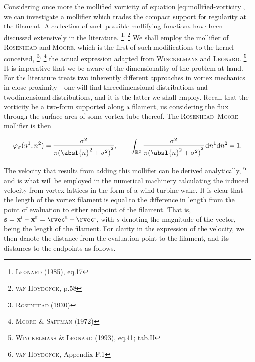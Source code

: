 Considering once more the mollified vorticity of equation \eqref{eq:mollified-vorticity}, we can investigate a mollifier which trades the compact support for regularity at the filament.
A collection of such possible mollifying functions have been discussed extensively in the literature.%
\footnote{%
  \cite{leonard1985computing} \textsc{Leonard} (1985), eq.17
}\textsuperscript{,}%
\footnote{%
  \cite{hoydonck2013computation} \textsc{van Hoydonck}, p.58
}
We shall employ the mollifier of \textsc{Rosenhead} and \textsc{Moore}, which is the first of such modifications to the kernel conceived,%
\footnote{%
  \cite{rosenhead1930spread} \textsc{Rosenhead} (1930)
}\textsuperscript{,}%
\footnote{%
  \cite{moore1972motion} \textsc{Moore} \& \textsc{Saffman} (1972)
}
the actual expression adapted from \textsc{Winckelmans} and \textsc{Leonard}.%
\footnote{%
  \cite{winckelmans1993contributions} \textsc{Winckelmans} \& \textsc{Leonard} (1993), eq.41; tab.II
}
It is imperative that we be aware of the dimensionality of the problem at hand.
For the literature treats two inherently different approaches in vortex mechanics in close proximity---one will find threedimensional distributions and twodimensional distributions, and it is the latter we shall employ.
Recall that the vorticity be a two-form supported along a filament, us considering the flux through the surface area of some vortex tube thereof.
The \textsc{Rosenhead}--\textsc{Moore} mollifier is then

\begin{equation}
  \varphi_{\sigma}(n^1, n^2) = \frac{\sigma^2}{\pi{(\absl{n}^2 + \sigma^2)}^2}, \qquad \int_{\reals^2} \frac{\sigma^2}{\pi{(\absl{n}^2 + \sigma^2)}^2} \,\dee n^1 \dee n^2 = 1.
\end{equation}

\noindent
The velocity that results from adding this mollifier can be derived analytically,%
\footnote{%
  \cite{hoydonck2013computation} \textsc{van Hoydonck}, Appendix F.1
}
and is what will be employed in the numerical machinery calculating the induced velocity from vortex lattices in the form of a wind turbine wake.
It is clear that the length of the vortex filament is equal to the difference in length from the point of evaluation to either endpoint of the filament.
That is, $\svec = \xvec^{\romani} - \xvec^{\romanii} = \rvec^{\romanii} - \rvec^{\romani}$, with $s$ denoting the magnitude of the vector, being the length of the filament.
For clarity in the expression of the velocity, we then denote the distance from the evaluation point to the filament, and its distances to the endpoints as follows.

